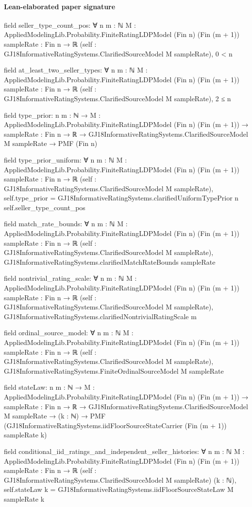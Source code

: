 \documentclass[10pt]{article}
\begin{document}
\paragraph{Lean-elaborated paper signature}
\begin{ReviewVerbatim}
field seller_type_count_pos:
∀ {n m : ℕ} {M : AppliedModelingLib.Probability.FiniteRatingLDPModel (Fin n) (Fin (m + 1))} {sampleRate : Fin n → ℝ}
  (self : GJ18InformativeRatingSystems.ClarifiedSourceModel M sampleRate), 0 < n

field at_least_two_seller_types:
∀ {n m : ℕ} {M : AppliedModelingLib.Probability.FiniteRatingLDPModel (Fin n) (Fin (m + 1))} {sampleRate : Fin n → ℝ}
  (self : GJ18InformativeRatingSystems.ClarifiedSourceModel M sampleRate), 2 ≤ n

field type_prior:
{n m : ℕ} →
  {M : AppliedModelingLib.Probability.FiniteRatingLDPModel (Fin n) (Fin (m + 1))} →
    {sampleRate : Fin n → ℝ} → GJ18InformativeRatingSystems.ClarifiedSourceModel M sampleRate → PMF (Fin n)

field type_prior_uniform:
∀ {n m : ℕ} {M : AppliedModelingLib.Probability.FiniteRatingLDPModel (Fin n) (Fin (m + 1))} {sampleRate : Fin n → ℝ}
  (self : GJ18InformativeRatingSystems.ClarifiedSourceModel M sampleRate),
  self.type_prior = GJ18InformativeRatingSystems.clarifiedUniformTypePrior n self.seller_type_count_pos

field match_rate_bounds:
∀ {n m : ℕ} {M : AppliedModelingLib.Probability.FiniteRatingLDPModel (Fin n) (Fin (m + 1))} {sampleRate : Fin n → ℝ}
  (self : GJ18InformativeRatingSystems.ClarifiedSourceModel M sampleRate),
  GJ18InformativeRatingSystems.clarifiedMatchRateBounds sampleRate

field nontrivial_rating_scale:
∀ {n m : ℕ} {M : AppliedModelingLib.Probability.FiniteRatingLDPModel (Fin n) (Fin (m + 1))} {sampleRate : Fin n → ℝ}
  (self : GJ18InformativeRatingSystems.ClarifiedSourceModel M sampleRate),
  GJ18InformativeRatingSystems.clarifiedNontrivialRatingScale m

field ordinal_source_model:
∀ {n m : ℕ} {M : AppliedModelingLib.Probability.FiniteRatingLDPModel (Fin n) (Fin (m + 1))} {sampleRate : Fin n → ℝ}
  (self : GJ18InformativeRatingSystems.ClarifiedSourceModel M sampleRate),
  GJ18InformativeRatingSystems.FiniteOrdinalSourceModel M sampleRate

field stateLaw:
{n m : ℕ} →
  {M : AppliedModelingLib.Probability.FiniteRatingLDPModel (Fin n) (Fin (m + 1))} →
    {sampleRate : Fin n → ℝ} →
      GJ18InformativeRatingSystems.ClarifiedSourceModel M sampleRate →
        (k : ℕ) → PMF (GJ18InformativeRatingSystems.iidFloorSourceStateCarrier (Fin (m + 1)) sampleRate k)

field conditional_iid_ratings_and_independent_seller_histories:
∀ {n m : ℕ} {M : AppliedModelingLib.Probability.FiniteRatingLDPModel (Fin n) (Fin (m + 1))} {sampleRate : Fin n → ℝ}
  (self : GJ18InformativeRatingSystems.ClarifiedSourceModel M sampleRate) (k : ℕ),
  self.stateLaw k = GJ18InformativeRatingSystems.iidFloorSourceStateLaw M sampleRate k
\end{ReviewVerbatim}
\end{document}
